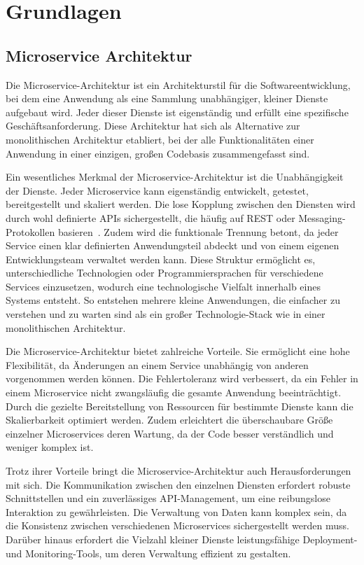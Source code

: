 \chapter{Grundlagen}\label{ch:foundation}


\section{Microservice Architektur}\label{sec:foundation_microservices}

Die Microservice-Architektur ist ein Architekturstil für die Softwareentwicklung, bei dem eine Anwendung als eine Sammlung unabhängiger, kleiner Dienste aufgebaut wird.
Jeder dieser Dienste ist eigenständig und erfüllt eine spezifische Geschäftsanforderung.
Diese Architektur hat sich als Alternative zur monolithischen Architektur etabliert, bei der alle Funktionalitäten einer Anwendung in einer einzigen, großen Codebasis zusammengefasst sind.

Ein wesentliches Merkmal der Microservice-Architektur ist die Unabhängigkeit der Dienste.
Jeder Microservice kann eigenständig entwickelt, getestet, bereitgestellt und skaliert werden.
Die lose Kopplung zwischen den Diensten wird durch wohl definierte \glspl{API} sichergestellt, die häufig auf REST
oder Messaging-Protokollen basieren~\cite{richardsonMicroservicesPatterns2018}.
Zudem wird die funktionale Trennung betont, da jeder Service einen klar definierten Anwendungsteil abdeckt und von einem eigenen Entwicklungsteam verwaltet werden kann.
Diese Struktur ermöglicht es, unterschiedliche Technologien oder Programmiersprachen für verschiedene Services einzusetzen, wodurch eine technologische Vielfalt innerhalb eines Systems entsteht.
So entstehen mehrere kleine Anwendungen, die einfacher zu verstehen und zu warten sind als ein großer
Technologie-Stack wie in einer monolithischen Architektur.

Die Microservice-Architektur bietet zahlreiche Vorteile.
Sie ermöglicht eine hohe Flexibilität, da Änderungen an einem Service unabhängig von anderen vorgenommen werden können.
Die Fehlertoleranz wird verbessert, da ein Fehler in einem Microservice nicht zwangsläufig die gesamte Anwendung beeinträchtigt.
Durch die gezielte Bereitstellung von Ressourcen für bestimmte Dienste kann die Skalierbarkeit optimiert werden.
Zudem erleichtert die überschaubare Größe einzelner Microservices deren Wartung, da der Code besser verständlich und weniger komplex ist.

Trotz ihrer Vorteile bringt die Microservice-Architektur auch Herausforderungen mit sich.
Die Kommunikation zwischen den einzelnen Diensten erfordert robuste Schnittstellen und ein zuverlässiges \gls{API}-Management, um eine reibungslose Interaktion zu gewährleisten.
Die Verwaltung von Daten kann komplex sein, da die Konsistenz zwischen verschiedenen Microservices sichergestellt
werden muss.
Darüber hinaus erfordert die Vielzahl kleiner Dienste leistungsfähige Deployment- und Monitoring-Tools, um deren Verwaltung effizient zu gestalten.


